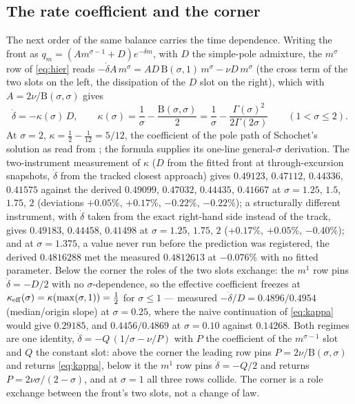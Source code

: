 \documentclass[11pt,a4paper]{article}
\theoremstyle{plain}
\theoremstyle{definition}
\newcommand{\Bfun}{\mathrm{B}}
\begin{document}
\subsection{The rate coefficient and the corner}\label{sec:rate}
The next order of the same balance carries the time dependence. Writing the front as $q_m=(Am^{\sigma-1}+D)e^{-\delta m}$, with $D$ the simple-pole admixture, the $m^\sigma$ row of \eqref{eq:hier} reads $-\dot\delta A\,m^\sigma=A D\,\Bfun(\sigma,1)\,m^\sigma-\nu D\,m^\sigma$ (the cross term of the two slots on the left, the dissipation of the $D$ slot on the right), which with $A=2\nu/\Bfun(\sigma,\sigma)$ gives
\begin{equation}\label{eq:kappa}
\dot\delta=-\kappa(\sigma)\,D,\qquad \kappa(\sigma)=\frac1\sigma-\frac{\Bfun(\sigma,\sigma)}{2}=\frac1\sigma-\frac{\Gamma(\sigma)^2}{2\Gamma(2\sigma)}\qquad(1<\sigma\le2).
\end{equation}
At $\sigma=2$, $\kappa=\tfrac12-\tfrac1{12}=5/12$, the coefficient of the pole path of Schochet's solution as read from \cite[\S5.1]{ALSS24}; the formula supplies its one-line general-$\sigma$ derivation. The two-instrument measurement of $\kappa$ ($D$ from the fitted front at through-excursion snapshots, $\dot\delta$ from the tracked closest approach) gives $0.49123$, $0.47112$, $0.44336$, $0.41575$ against the derived $0.49099$, $0.47032$, $0.44435$, $0.41667$ at $\sigma=1.25$, $1.5$, $1.75$, $2$ (deviations $+0.05\%$, $+0.17\%$, $-0.22\%$, $-0.22\%$); a structurally different instrument, with $\dot\delta$ taken from the exact right-hand side instead of the track, gives $0.49183$, $0.44458$, $0.41498$ at $\sigma=1.25$, $1.75$, $2$ ($+0.17\%$, $+0.05\%$, $-0.40\%$); and at $\sigma=1.375$, a value never run before the prediction was registered, the derived $0.4816288$ met the measured $0.4812613$ at $-0.076\%$ with no fitted parameter. Below the corner the roles of the two slots exchange: the $m^1$ row pins $\dot\delta=-D/2$ with no $\sigma$-dependence, so the effective coefficient freezes at $\kappa_{\rm eff}(\sigma)=\kappa(\max(\sigma,1))=\tfrac12$ for $\sigma\le1$ --- measured $-\dot\delta/D=0.4896/0.4954$ (median/origin slope) at $\sigma=0.25$, where the naive continuation of \eqref{eq:kappa} would give $0.29185$, and $0.4456/0.4869$ at $\sigma=0.10$ against $0.14268$. Both regimes are one identity, $\dot\delta=-Q\,(1/\sigma-\nu/P)$ with $P$ the coefficient of the $m^{\sigma-1}$ slot and $Q$ the constant slot: above the corner the leading row pins $P=2\nu/\Bfun(\sigma,\sigma)$ and returns \eqref{eq:kappa}, below it the $m^1$ row pins $\dot\delta=-Q/2$ and returns $P=2\nu\sigma/(2-\sigma)$, and at $\sigma=1$ all three rows collide. The corner is a role exchange between the front's two slots, not a change of law.
\end{document}
